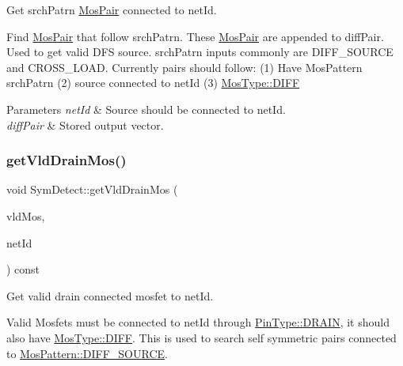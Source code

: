 Get srch\+Patrn \hyperlink{classMosPair}{Mos\+Pair} connected to net\+Id. 

Find \hyperlink{classMosPair}{Mos\+Pair} that follow srch\+Patrn. These \hyperlink{classMosPair}{Mos\+Pair} are appended to diff\+Pair. Used to get valid D\+FS source. srch\+Patrn inputs commonly are D\+I\+F\+F\+\_\+\+S\+O\+U\+R\+CE and C\+R\+O\+S\+S\+\_\+\+L\+O\+AD. Currently pairs should follow\+: (1) Have Mos\+Pattern srch\+Patrn (2) source connected to net\+Id (3) \hyperlink{type_8h_a34a6a66323cfecf83dfe00bc8fd96333aa2e1ec2dd3d8195d238c5494f0ac5578}{Mos\+Type\+::\+D\+I\+FF}


\begin{DoxyParams}{Parameters}
{\em net\+Id} & Source should be connected to net\+Id. \\
\hline
{\em diff\+Pair} & Stored output vector. \\
\hline
\end{DoxyParams}
\mbox{\label{classSymDetect_a48c23173bf5e56c3aa11ac306715cba2}} 
\subsubsection{\texorpdfstring{get\+Vld\+Drain\+Mos()}{getVldDrainMos()}}
{\footnotesize\ttfamily void Sym\+Detect\+::get\+Vld\+Drain\+Mos (\begin{DoxyParamCaption}\item[{std\+::vector$<$ \hyperlink{type_8h_a581e8093e28e7362f2b6937296190676}{Index\+Type} $>$ \&}]{vld\+Mos,  }\item[{\hyperlink{type_8h_a581e8093e28e7362f2b6937296190676}{Index\+Type}}]{net\+Id }\end{DoxyParamCaption}) const\hspace{0.3cm}{\ttfamily [private]}}



Get valid drain connected mosfet to net\+Id. 

Valid Mosfets must be connected to net\+Id through \hyperlink{type_8h_afaab50027002ecbb6c8ac27e727d1bb4ad22e8f7ce637479aeffe9dab9ee7337d}{Pin\+Type\+::\+D\+R\+A\+IN}, it should also have \hyperlink{type_8h_a34a6a66323cfecf83dfe00bc8fd96333aa2e1ec2dd3d8195d238c5494f0ac5578}{Mos\+Type\+::\+D\+I\+FF}. This is used to search self symmetric pairs connected to \hyperlink{type_8h_af19eddb079bfea723256710b029c38e8ad45b64a7d6b85dde1b52dd5a18863933}{Mos\+Pattern\+::\+D\+I\+F\+F\+\_\+\+S\+O\+U\+R\+CE}.



